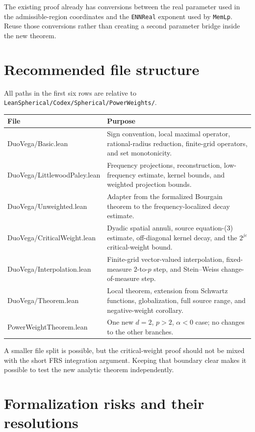 \documentclass[11pt,a4paper]{article}
\theoremstyle{definition}
\theoremstyle{remark}
\newcommand{\lean}{\texttt}
\begin{document}
The existing proof already has conversions between the real parameter used in
the admissible-region coordinates and the \lean{ENNReal} exponent used by
\lean{MemLp}.  Reuse those conversions rather than creating a second parameter
bridge inside the new theorem.

\section{Recommended file structure}

All paths in the first six rows are relative to
\lean{LeanSpherical/Codex/Spherical/PowerWeights/}.

\begin{longtable}{>{\raggedright\arraybackslash\ttfamily}p{}p{}}
\toprule
\normalfont File & Purpose \\
\midrule
\endhead
DuoVega/Basic.lean &
Sign convention, local maximal operator, rational-radius reduction, finite-grid
operators, and set monotonicity. \\
\addlinespace
DuoVega/LittlewoodPaley.lean &
Frequency projections, reconstruction, low-frequency estimate, kernel bounds,
and weighted projection bounds. \\
\addlinespace
DuoVega/Unweighted.lean &
Adapter from the formalized Bourgain theorem to the frequency-localized decay
estimate. \\
\addlinespace
DuoVega/CriticalWeight.lean &
Dyadic spatial annuli, source equation-(3) estimate, off-diagonal kernel decay,
and the $2^{j\varepsilon}$ critical-weight bound. \\
\addlinespace
DuoVega/Interpolation.lean &
Finite-grid vector-valued interpolation, fixed-measure $2$-to-$p$ step, and
Stein--Weiss change-of-measure step. \\
\addlinespace
DuoVega/Theorem.lean &
Local theorem, extension from Schwartz functions, globalization, full source
range, and negative-weight corollary. \\
\addlinespace
PowerWeightTheorem.lean &
One new $d=2$, $p>2$, $\alpha<0$ case; no changes to the other branches. \\
\bottomrule
\end{longtable}

A smaller file split is possible, but the critical-weight proof should not be
mixed with the short FRS integration argument.  Keeping that boundary clear
makes it possible to test the new analytic theorem independently.

\section{Formalization risks and their resolutions}
\end{document}
